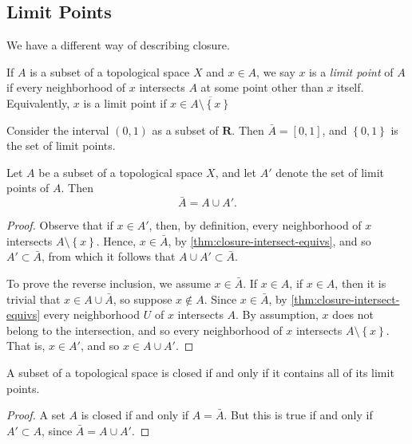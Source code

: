 \subsection{Limit Points}
We have a different way of describing closure.
\begin{definition}
	If $A$ is a subset of a topological space $X$ and $x \in A$, we say $x$
	is a \emph{limit point} of $A$ if every neighborhood of $x$ intersects
	$A$ at some point other than $x$ itself. Equivalently,
	$x$ is a limit point if $x \in \overline{A \setminus \left\{ x \right\}}$
\end{definition}
\begin{example}
	Consider the interval \((0,1)\) as a subset of \(\mathbf{R}\). Then \(\bar{A} =
	[0,1]\), and \(\left\{ 0,1 \right\}\) is the set of limit points.
\end{example}
\begin{theorem}
	\label{thm:limit-points-def-closedness}
	Let \(A\) be a subset of a topological space \(X\), and let \(A'\) denote the
	set of limit points of \(A\). Then
	\begin{equation*}
		\bar{A} = A \cup A'.
	\end{equation*}
	\begin{proof}
		Observe that if \(x \in A'\), then, by definition, every neighborhood of
		\(x\) intersects \(A\setminus \left\{ x \right\}\). Hence, \(x \in
		\bar{A}\), by \cref{thm:closure-intersect-equivs}, and so
		\(A' \subset \bar{A}\), from which it follows that \(A \cup A' \subset
		\bar{A}\).
		\par
		To prove the reverse inclusion, we assume \(x \in \bar{A}\). If \(x \in A\),
		if \(x \in A\), then it is trivial that \(x \in A \cup \bar{A}\), so suppose
		\(x \not \in A\). Since \(x \in \bar{A}\), by
		\cref{thm:closure-intersect-equivs} every neighborhood \(U\) of \(x\)
		intersects \(A\). By assumption, \(x\) does not belong to the intersection,
	and so every neighborhood of \(x\) intersects \(A\setminus \left\{ x
	\right\} \). That is, \(x \in A'\), and so \(x \in A \cup A'\).
	\end{proof}
\end{theorem}
\begin{corollary}
	\label{cor:subset-closed-iff-lim-points}
	A subset of a topological space is closed if and only if it contains all of
	its limit points.
\end{corollary}
\begin{proof}
	A set \(A\) is closed if and only if \(A = \bar{A}\). But this is true
	if and only if \( A' \subset A\), since \(\bar{A} = A \cup A'\).
\end{proof}
